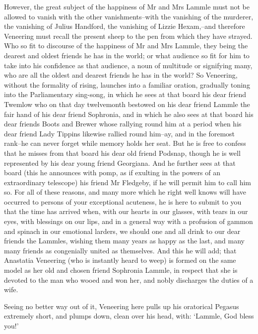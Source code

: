 However, the great subject of the happiness of Mr and Mrs Lammle must
not be allowed to vanish with the other vanishments--with the vanishing
of the murderer, the vanishing of Julius Handford, the vanishing of
Lizzie Hexam,--and therefore Veneering must recall the present sheep
to the pen from which they have strayed. Who so fit to discourse of
the happiness of Mr and Mrs Lammle, they being the dearest and oldest
friends he has in the world; or what audience so fit for him to take
into his confidence as that audience, a noun of multitude or signifying
many, who are all the oldest and dearest friends he has in the world?
So Veneering, without the formality of rising, launches into a familiar
oration, gradually toning into the Parliamentary sing-song, in which he
sees at that board his dear friend Twemlow who on that day twelvemonth
bestowed on his dear friend Lammle the fair hand of his dear friend
Sophronia, and in which he also sees at that board his dear friends
Boots and Brewer whose rallying round him at a period when his dear
friend Lady Tippins likewise rallied round him--ay, and in the foremost
rank--he can never forget while memory holds her seat. But he is free
to confess that he misses from that board his dear old friend Podsnap,
though he is well represented by his dear young friend Georgiana. And he
further sees at that board (this he announces with pomp, as if exulting
in the powers of an extraordinary telescope) his friend Mr Fledgeby, if
he will permit him to call him so. For all of these reasons, and many
more which he right well knows will have occurred to persons of your
exceptional acuteness, he is here to submit to you that the time has
arrived when, with our hearts in our glasses, with tears in our eyes,
with blessings on our lips, and in a general way with a profusion of
gammon and spinach in our emotional larders, we should one and all drink
to our dear friends the Lammles, wishing them many years as happy as
the last, and many many friends as congenially united as themselves. And
this he will add; that Anastatia Veneering (who is instantly heard to
weep) is formed on the same model as her old and chosen friend Sophronia
Lammle, in respect that she is devoted to the man who wooed and won her,
and nobly discharges the duties of a wife.

Seeing no better way out of it, Veneering here pulls up his oratorical
Pegasus extremely short, and plumps down, clean over his head, with:
‘Lammle, God bless you!’

